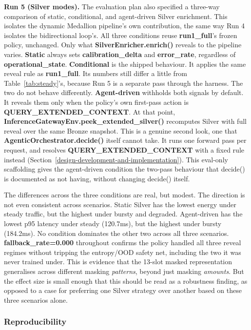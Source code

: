 \textbf{Run 5 (Silver modes).} The evaluation plan also specified a
three-way comparison of static, conditional, and agent-driven Silver
enrichment. This isolates the dynamic Medallion pipeline's own
contribution, the same way Run 4 isolates the bidirectional loop's.
All three conditions reuse \textbf{run1\_full}'s frozen policy,
unchanged. Only what \textbf{SilverEnricher.enrich()} reveals to the pipeline
varies. \textbf{Static} always sets \textbf{calibration\_delta} and
\textbf{error\_rate}, regardless of \textbf{operational\_state}.
\textbf{Conditional} is the shipped behaviour. It applies the same
reveal rule as \textbf{run1\_full}. Its numbers still differ a little
from Table~\ref{tab:steady}'s, because Run 5 is a separate pass through
the harness. The two do not behave differently. \textbf{Agent-driven} withholds both signals by default. It
reveals them only when the policy's own first-pass action is
\textbf{QUERY\_EXTENDED\_CONTEXT}. At that point,
\textbf{InferenceGatewayEnv.peek\_extended\_silver()} recomputes Silver
with full reveal over the same Bronze snapshot. This is a genuine
second look, one that \textbf{AgenticOrchestrator.decide()} itself
cannot take. It runs one forward pass per request, and resolves
\textbf{QUERY\_EXTENDED\_CONTEXT} with a fixed rule instead (Section~\ref{design-development-and-implementation}). This eval-only scaffolding gives the agent-driven
condition the two-pass behaviour that decide() is documented as not
having, without changing decide() itself.

The differences across the three conditions are real, but modest. The
direction is not even consistent across scenarios. Static Silver has
the lowest energy under steady traffic, but the highest under bursty
and degraded. Agent-driven has the lowest p95 latency under steady
(120.7ms), but the highest under bursty (184.2ms). No condition
dominates the other two across all three scenarios.
\textbf{fallback\_rate=0.000} throughout confirms the policy handled
all three reveal regimes without tripping the entropy/OOD safety net,
including the two it was never trained under. This is evidence that
the 13-slot masked representation generalises across different masking
\emph{patterns}, beyond just masking \emph{amounts}. But the effect size
is small enough that this should be read as a robustness finding,
as opposed to a case for preferring one Silver strategy over another based on
these three scenarios alone.

\hypertarget{reproducibility}{%
\subsubsection{Reproducibility}\label{reproducibility}}

